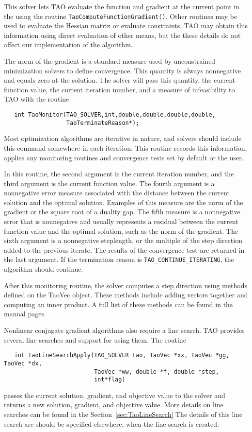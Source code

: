 This solver lets TAO evaluate the function and gradient at the
current point in the using the routine {\tt TaoComputeFunctionGradient()}.
Other routines may be used to evaluate the Hessian matrix or evaluate
constraints.  TAO may obtain this information using direct evaluation 
of other means, but the these details do not affect our implementation
of the algorithm.

The norm of the gradient is a standard measure used
by unconstrained minimization solvers to define convergence.
This quantity is always nonnegative and equals zero at the solution.  
The solver will pass this quantity, the current
function value, the current iteration number, and a measure of
infeasibility to TAO with the routine
\begin{verbatim}
   int TaoMonitor(TAO_SOLVER,int,double,double,double,double,
                  TaoTerminateReason*);
\end{verbatim}
Most optimization algorithms are iterative in nature, and solvers should
include this command somewhere in each iteration.  This routine
records this information, applies any monitoring routines and 
convergence tests set by default or the user.

In this routine, the second argument is the current
iteration number, and the third argument is the current function value.
The fourth argument is a nonnegative error measure associated with the
distance between the current solution and the optimal solution.  Examples
of this measure are the norm of the gradient or the square root of a duality 
gap. The fifth measure is a nonnegative error 
that is nonnegative and usually
represents a residual between the current function value and the
optimal solution, such as the norm of the
gradient.  The sixth argument is a nonnegative steplength, 
or the multiple of the step direction added to the previous iterate.
The results of the convergence test are returned in the last argument.
If the termination reason is {\tt TAO\_CONTINUE\_ITERATING}, the
algorithm should continue.

After this monitoring routine, the solver computes a step direction
using methods defined on the TaoVec object.  These methods include
adding vectors together and computing an inner product.  A full list
of these methods can be found in the manual pages.

Nonlinear conjugate gradient algorithms also require a line search.  TAO
provides several line searches and support for using them.
The routine
\begin{verbatim}
   int TaoLineSearchApply(TAO_SOLVER tao, TaoVec *xx, TaoVec *gg, TaoVec *dx,
                          TaoVec *ww, double *f, double *step,
                          int*flag)
\end{verbatim}
passes the current solution, gradient, and objective value to the
solver and returns a new solution, gradient, and objective value.  More
details on line searches can be found in the Section~\ref{sec:TaoLineSearch}
The details of this line search are should be specified elsewhere, when
the line search is created.

